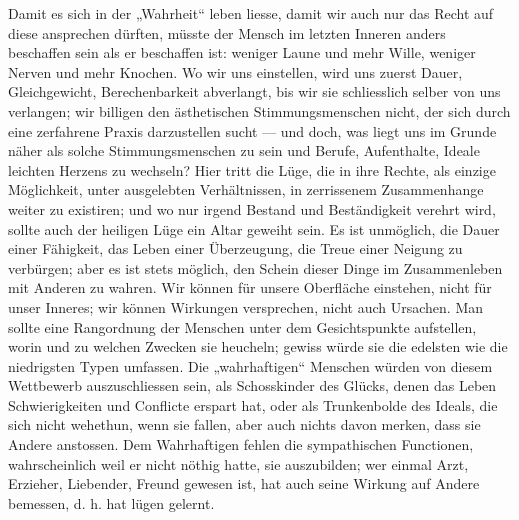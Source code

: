 Damit es sich in der „Wahrheit“ leben liesse, damit wir auch nur das Recht auf diese  ansprechen dürften, müsste der Mensch im letzten Inneren anders beschaffen sein als er beschaffen ist: weniger Laune und mehr Wille, weniger Nerven und mehr Knochen. Wo wir uns einstellen, wird uns zuerst Dauer, Gleichgewicht, Berechenbarkeit abverlangt, bis wir sie schliesslich selber von uns verlangen; wir billigen den ästhetischen Stimmungsmenschen nicht, der sich durch eine zerfahrene Praxis darzustellen sucht — und doch, was liegt uns im Grunde näher als solche Stimmungsmenschen zu sein und Berufe, Aufenthalte, Ideale leichten Herzens zu wechseln? Hier tritt die Lüge, die  in ihre Rechte, als einzige Möglichkeit, unter ausgelebten Verhältnissen, in zerrissenem Zusammenhange weiter zu existiren; und wo nur irgend Bestand und Beständigkeit verehrt wird, sollte auch der heiligen Lüge ein Altar geweiht sein. Es ist unmöglich, die Dauer einer Fähigkeit, das Leben einer Überzeugung, die Treue einer Neigung zu verbürgen; aber es ist stets möglich, den Schein dieser Dinge im Zusammenleben mit Anderen zu wahren. Wir können für unsere Oberfläche einstehen, nicht für unser Inneres; wir können Wirkungen versprechen, nicht auch Ursachen. Man sollte eine Rangordnung der Menschen unter dem Gesichtspunkte aufstellen, worin und zu welchen Zwecken sie heucheln; gewiss würde sie die edelsten wie die niedrigsten Typen umfassen. Die „wahrhaftigen“ Menschen würden von diesem Wettbewerb auszuschliessen sein, als Schosskinder des Glücks, denen das Leben Schwierigkeiten und Conflicte erspart hat, oder als Trunkenbolde des Ideals, die sich nicht wehethun, wenn sie fallen, aber auch nichts davon merken, dass sie Andere anstossen. Dem Wahrhaftigen fehlen die sympathischen Functionen, wahrscheinlich weil er nicht nöthig hatte, sie auszubilden; wer einmal Arzt, Erzieher, Liebender, Freund gewesen ist, hat auch seine Wirkung auf Andere bemessen, d. h. hat lügen gelernt.
\par

